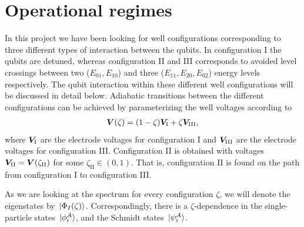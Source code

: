 \documentclass[twocolumn,superscriptaddress,unsortedaddress,
 amsmath,amssymb,
 aps,
]{revtex4-2}
\begin{document}
\section{Operational regimes}
    In this project we have been looking for well configurations corresponding to three different types of interaction between the qubits. In configuration I the qubits are detuned, whereas configuration II and III corresponds to avoided level crossings between two ($E_{01}, E_{10}$) and three ($E_{11}, E_{20}, E_{02}$) energy levels respectively. The qubit interaction within these different well configurations will be discussed in detail below. Adiabatic transitions between the different configurations can be achieved by parameterizing the well voltages according to
    \begin{align}
        \vb*{V}(\zeta) = (1-\zeta)\vb*{V}_\mathrm{I} + \zeta\vb*{V}_\mathrm{III},
        \label{eq:well-parameterization}
    \end{align}
    where $\vb*{V}_\mathrm{I}$ are the electrode voltages for configuration I and $\vb*{V}_\mathrm{III}$ are the electrode voltages for configuration III. Configuration II is obtained with voltages $\vb*{V}_\mathrm{II} = \vb*{V}(\zeta_\mathrm{II})$ for some $\zeta_\mathrm{II}\in(0,1)$.
    That is, configuration II is found on the path from configuration I to configuration III.

    As we are looking at the spectrum for every configuration $\zeta$, we will denote
    the eigenstates by $\ket*{\Phi_I(\zeta)}$.
    Correspondingly, there is a $\zeta$-dependence in the single-particle states
    $\ket*{\phi^{A}_i}$, and the Schmidt states $\ket*{\psi^{A}_i}$.
\end{document}
